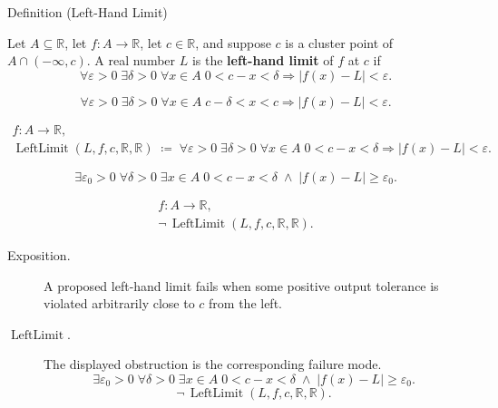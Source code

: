 \begin{definitionbox}{Definition (Left-Hand Limit)}
\begin{definition}
\label{def:left-hand-limit}
Let $A\subseteq\mathbb{R}$, let $f:A\to\mathbb{R}$, let $c\in\mathbb{R}$,
and suppose $c$ is a cluster point of $A\cap(-\infty,c)$. A real number
$L$ is the \textbf{left-hand limit} of $f$ at $c$ if
\[
  \forall\varepsilon>0\;\exists\delta>0\;\forall x\in A\;
  0<c-x<\delta\Rightarrow |f(x)-L|<\varepsilon.
\]
\end{definition}
\end{definitionbox}

\begin{remark*}
\[
  \forall\varepsilon>0\;\exists\delta>0\;\forall x\in A\;
  c-\delta<x<c\Rightarrow |f(x)-L|<\varepsilon.
\]
\end{remark*}

\begin{remark*}
\[
\begin{aligned}
  f\colon A\to\mathbb{R},\\
  \operatorname{LeftLimit}(L,f,c,\mathbb{R},\mathbb{R})
  \;\coloneqq\;
  \forall\varepsilon>0\;\exists\delta>0\;\forall x\in A\;
  0<c-x<\delta\Rightarrow |f(x)-L|<\varepsilon.
\end{aligned}
\]
\end{remark*}

\begin{remark*}
\[
  \exists\varepsilon_0>0\;\forall\delta>0\;\exists x\in A\;
  0<c-x<\delta\;\wedge\; |f(x)-L|\geq\varepsilon_0.
\]
\end{remark*}

\begin{remark*}
\[
\begin{aligned}
  f\colon A\to\mathbb{R},\\
  \neg\,\operatorname{LeftLimit}(L,f,c,\mathbb{R},\mathbb{R}).
\end{aligned}
\]
\end{remark*}

\begin{remark*}
\begin{description}
  \item[Exposition.]
A proposed left-hand limit fails when some positive output tolerance is
violated arbitrarily close to $c$ from the left.


  \item[\(\operatorname{LeftLimit}.\)]
  The displayed obstruction is the corresponding failure mode.
  \[
\exists\varepsilon_0>0\;\forall\delta>0\;\exists x\in A\;
  0<c-x<\delta\;\wedge\; |f(x)-L|\geq\varepsilon_0.
  \]
  \[
\neg\,\operatorname{LeftLimit}(L,f,c,\mathbb{R},\mathbb{R}).
  \]
\end{description}
\end{remark*}

